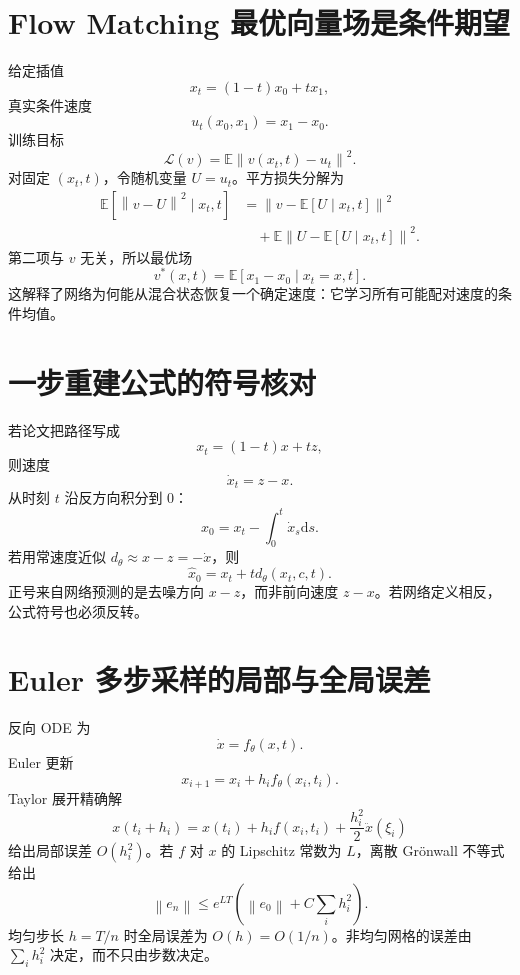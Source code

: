\documentclass[UTF8,12pt,a4paper,fontset=none]{ctexart}
\numberwithin{equation}{section}
\newcommand{\E}{\mathbb{E}}
\newcommand{\Loss}{\mathcal{L}}
\newcommand{\norm}[1]{\left\lVert #1\right\rVert}
\newcommand{\dd}{\mathrm{d}}
\begin{document}
\section{Flow Matching 最优向量场是条件期望}
给定插值
\begin{equation}
 x_t=(1-t)x_0+tx_1,
\end{equation}
真实条件速度
\begin{equation}
 u_t(x_0,x_1)=x_1-x_0.
\end{equation}
训练目标
\begin{equation}
 \Loss(v)=\E\norm{v(x_t,t)-u_t}^2.
\end{equation}
对固定 $(x_t,t)$，令随机变量 $U=u_t$。平方损失分解为
\begin{align}
 \E[\norm{v-U}^2\mid x_t,t]
 &=\norm{v-\E[U\mid x_t,t]}^2\\
 &\quad+\E\norm{U-\E[U\mid x_t,t]}^2.
\end{align}
第二项与 $v$ 无关，所以最优场
\begin{equation}
 \boxed{v^*(x,t)=\E[x_1-x_0\mid x_t=x,t].}
\end{equation}
这解释了网络为何能从混合状态恢复一个确定速度：它学习所有可能配对速度的条件均值。

\section{一步重建公式的符号核对}
若论文把路径写成
\begin{equation}
 x_t=(1-t)x+t z,
\end{equation}
则速度
\begin{equation}
 \dot x_t=z-x.
\end{equation}
从时刻 $t$ 沿反方向积分到 $0$：
\begin{equation}
 x_0=x_t-\int_0^t\dot x_s\dd s.
\end{equation}
若用常速度近似 $d_\theta\approx x-z=-\dot x$，则
\begin{equation}
 \boxed{\widehat x_0=x_t+t d_\theta(x_t,c,t).}
\end{equation}
正号来自网络预测的是去噪方向 $x-z$，而非前向速度 $z-x$。若网络定义相反，公式符号也必须反转。

\section{Euler 多步采样的局部与全局误差}
反向 ODE 为
\begin{equation}
 \dot x=f_\theta(x,t).
\end{equation}
Euler 更新
\begin{equation}
 x_{i+1}=x_i+h_if_\theta(x_i,t_i).
\end{equation}
Taylor 展开精确解
\begin{equation}
 x(t_i+h_i)=x(t_i)+h_if(x_i,t_i)+\frac{h_i^2}{2}\ddot x(\xi_i)
\end{equation}
给出局部误差 $O(h_i^2)$。若 $f$ 对 $x$ 的 Lipschitz 常数为 $L$，离散 Grönwall 不等式给出
\begin{equation}
 \norm{e_n}\le
 e^{LT}\left(\norm{e_0}+C\sum_i h_i^2\right).
\end{equation}
均匀步长 $h=T/n$ 时全局误差为 $O(h)=O(1/n)$。非均匀网格的误差由 $\sum_i h_i^2$ 决定，而不只由步数决定。
\end{document}

